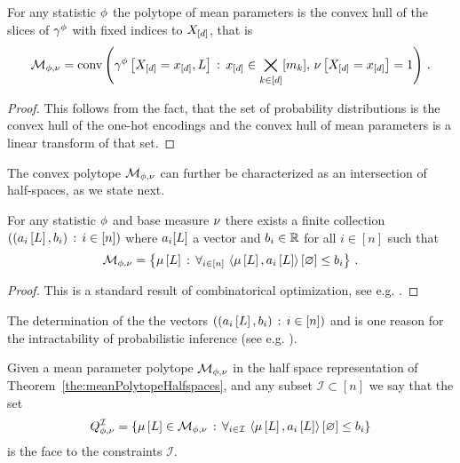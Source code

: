 \begin{theorem}
    \label{the:meanPolytopeConvHull}
    For any statistic $\phi$ the polytope of mean parameters is the convex hull of the slices of $\gamma^{\phi}$ with fixed indices to $X_{[d]}$, that is
    \begin{align*}
        \mathcal{M}_{\phi,\nu}
        = \mathrm{conv}\left(\gamma^{\phi}\left[X_{[d]}=x_{[d]},L\right] \, : \, x_{[d]}\in\bigtimes_{k\in[d]}[m_{k}], \, \nu\left[X_{[d]}=x_{[d]}\right]=1\right) \, .
    \end{align*}
\end{theorem}
\begin{proof}
    This follows from the fact, that the set of probability distributions is the convex hull of the one-hot encodings and the convex hull of mean parameters is a linear transform of that set.
\end{proof}


The convex polytope $\mathcal{M}_{\phi,\nu}$ can further be characterized as an intersection of half-spaces, as we state next.

\begin{theorem}
    \label{the:meanPolytopeHalfspaces}
    For any statistic $\phi$ and base measure $\nu$ there exists a finite collection $\left( (a_{i}\left[L\right],b_{i}) \, : \, i \in[n]\right)$ where $a_i[L]$ a vector and $b_i\in\mathbb{R}$ for all $i\in[n]$ such that
    \begin{align*}
        \mathcal{M}_{\phi,\nu}
        = \left\{\mu\left[L\right] \, : \, \forall_{i\in[n]} \, \left\langle \mu\left[L\right],a_{i}\left[L\right]\right\rangle \left[ \varnothing \right]\leq b_{i} \right\} \, .
    \end{align*}
\end{theorem}
\begin{proof}
    This is a standard result of combinatorical optimization, see e.g. \cite{ziegler_lectures_2013}.
\end{proof}

The determination of the the vectors $\left( (a_{i}\left[L\right],b_{i}) \, : \, i \in[n]\right)$ and is one reason for the intractability of probabilistic inference (see e.g. \cite{wainwright_graphical_2008}).



\begin{definition}
    \label{def:meanPolytopeFaces}
    Given a mean parameter polytope $\mathcal{M}_{\phi,\nu}$ in the half space representation of Theorem~\ref{the:meanPolytopeHalfspaces}, and any subset $\mathcal{I}\subset[n]$ we say that the set
    \begin{align*}
        Q^{\mathcal{I}}_{\phi,\nu} = \left\{\mu\left[L\right]\in\mathcal{M}_{\phi,\nu} \, : \, \forall_{i\in\mathcal{I}} \, \left\langle \mu\left[L\right],a_{i}\left[L\right]\right\rangle \left[ \varnothing \right]\leq b_{i} \right\}
    \end{align*}
    is the face to the constraints $\mathcal{I}$.
\end{definition}


